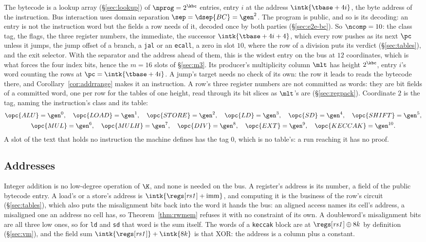 The bytecode is a lookup array (\S\ref{sec:lookup}) of $\nprog = 2^{\kbc}$ entries, entry $i$ at the address $\intk{\tbase+4i}$, the byte address of the instruction. Bus interaction uses domain separation $\sep=\dsep{BC} = \gen^{2}$. The program is public, and so is its decoding: an entry is not the instruction word but the fields a row needs of it, decoded once by both parties (\S\ref{sec:e2e-bc}). So $\ncomp=10$: the class tag, the flags, the three register numbers, the immediate, the successor $\intk{\tbase+4i+4}$, which every row pushes as its next $\pc$ unless it jumps, the jump offset of a branch, a \texttt{jal} or an \texttt{ecall}, a zero in slot $10$, where the row of a division puts its verdict (\S\ref{sec:tables}), and the exit selector. With the separator and the address ahead of them, this is the widest entry on the bus at $12$ coordinates, which is what forces the four index bits, hence the $m=16$ slots of \S\ref{sec:m3}. Its producer's multiplicity column $\mlt$ has height $2^{\kbc}$, entry $i$'s word counting the rows at $\pc=\intk{\tbase+4i}$. A jump's target needs no check of its own: the row it leads to reads the bytecode there, and Corollary~\ref{cor:addrrange} makes it an instruction. A row's three register numbers are not committed as words: they are bit fields of a committed word, one per row for the tables of one height, read through its bit slices as $\mlt$'s are (\S\ref{sec:regpack}). Coordinate $2$ is the tag, naming the instruction's class and its table:
\begin{gather*}
  \opc{ALU}=\gen^{0},\quad \opc{LOAD}=\gen^{1},\quad \opc{STORE}=\gen^{2},\quad \opc{LD}=\gen^{3},\quad \opc{SD}=\gen^{4},\quad \opc{SHIFT}=\gen^{5},\\
  \opc{MUL}=\gen^{6},\quad \opc{MULH}=\gen^{7},\quad \opc{DIV}=\gen^{8},\quad \opc{EXT}=\gen^{9},\quad \opc{KECCAK}=\gen^{10}.
\end{gather*}
A slot of the text that holds no instruction the machine defines has the tag $0$, which is no table's: a run reaching it has no proof.

\subsection{Addresses}\label{sec:exp}

Integer addition is no low-degree operation of $\K$, and none is needed on the bus. A register's address is its number, a field of the public bytecode entry. A load's or a store's address is $\intk{\regs[\mathit{rs1}]+\mathrm{imm}}$, and computing it is the business of the row's circuit (\S\ref{sec:tables}), which also puts the misalignment bits back into the word it hands the bus: an aligned access names its cell's address, a misaligned one an address no cell has, so Theorem~\ref{thm:rwmem} refuses it with no constraint of its own. A doubleword's misalignment bits are all three low ones, so for \texttt{ld} and \texttt{sd} that word is the sum itself. The words of a \texttt{keccak} block are at $\regs[\mathit{rs1}]\oplus8k$ by definition (\S\ref{sec:vm}), and the field sum $\intk{\regs[\mathit{rs1}]}+\intk{8k}$ is that XOR: the address is a column plus a constant.


